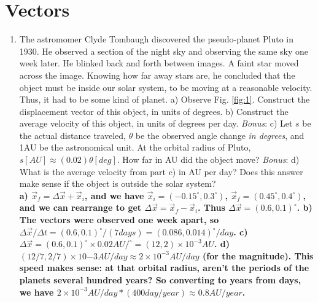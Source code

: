 \documentclass[10pt]{article}
\begin{document}
\section{Vectors}
\begin{enumerate}
\item The astromomer Clyde Tombaugh discovered the pseudo-planet Pluto in 1930.  He observed a section of the night sky and observing the same sky one week later.  He blinked back and forth between images.  A faint star moved across the image.  Knowing how far away stars are, he concluded that the object must be inside our solar system, to be moving at a reasonable velocity.  Thus, it had to be some kind of planet.
a) Observe Fig. \ref{fig:1}.  Construct the displacement vector of this object, in units of degrees.  b) Construct the average velocity of this object, in units of degrees per day.  \textit{Bonus}: c) Let $s$ be the actual distance traveled, $\theta$ be the observed angle change \textit{in degrees}, and 1AU be the astronomical unit.  At the orbital radius of Pluto, $s[AU] \approx (0.02) \theta[deg]$.  How far in AU did the object move?  \textit{Bonus}: d) What is the average velocity from part c) in AU per day?  Does this answer make sense if the object is outside the solar system?
\vspace{0.5 cm} \\
\textbf{a) $\vec{x}_f = \Delta \vec{x} + \vec{x}_i$, and we have $\vec{x}_i = (-0.15^{\circ},0.3^{\circ})$, $\vec{x}_f = (0.45^{\circ},0.4^{\circ})$, and we can rearrange to get $\Delta \vec{x} = \vec{x}_f - \vec{x}_i$.  Thus $\Delta\vec{x} = (0.6,0.1)^{\circ}$. b) The vectors were observed one week apart, so $\Delta\vec{x}/\Delta t = (0.6,0.1)^{\circ}/(7 days) = (0.086,0.014)^{\circ}/day$.  c) $\Delta \vec{x} = (0.6,0.1)^{\circ} \times 0.02 AU/^{\circ} = (12,2) \times 10^{-3} AU$.  d) $(12/7,2/7) \times 10{-3} AU/day \approx 2 \times 10^{-3} AU/day$ (for the magnitude).  This speed makes sense: at that orbital radius, aren't the periods of the planets several hundred years?  So converting to years from days, we have $2 \times 10^{-3} AU/day * (400 day/year) \approx 0.8 AU/year$.}
\vspace{0.4 cm}
\end{enumerate}
\end{document}
